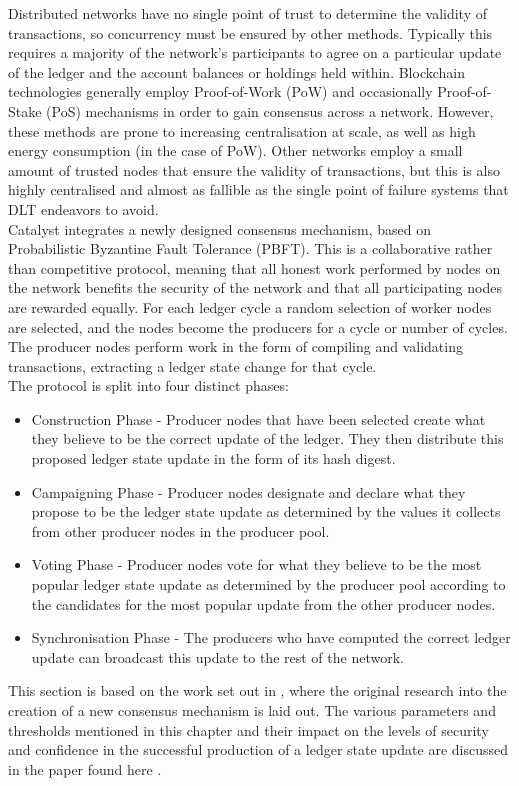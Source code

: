 Distributed networks have no single point of trust to determine the validity of transactions, so concurrency must be ensured by other methods. Typically this requires a majority of the network's participants to agree on a particular update of the ledger and the account balances or holdings held within. Blockchain technologies generally employ Proof-of-Work (PoW) and occasionally Proof-of-Stake (PoS) mechanisms in order to gain consensus across a network. However, these methods are prone to increasing centralisation at scale, as well as high energy consumption (in the case of PoW). Other networks employ a small amount of trusted nodes that ensure the validity of transactions, but this is also highly centralised and almost as fallible as the single point of failure systems that DLT endeavors to avoid. \\

Catalyst integrates a newly designed consensus mechanism, based on Probabilistic Byzantine Fault Tolerance (PBFT).  This is a collaborative rather than competitive protocol, meaning that all honest work performed by nodes on the network benefits the security of the network and that all participating nodes are rewarded equally. For each ledger cycle a random selection of worker nodes are selected, and the nodes become the producers for a cycle or number of cycles. The producer nodes perform work in the form of compiling and validating transactions, extracting a ledger state change for that cycle. \\

The protocol is split into four distinct phases:

\begin{itemize}

\item Construction Phase - Producer nodes that have been selected create what they believe to be the correct update of the ledger. They then distribute this proposed ledger state update in the form of its hash digest.
\item Campaigning Phase - Producer nodes designate and declare what they propose to be the ledger state update as determined by the values it collects from other producer nodes in the producer pool.
\item Voting Phase - Producer nodes vote for what they believe to be the most popular ledger state update as determined by the producer pool according to the candidates for the most popular update from the other producer nodes.
\item Synchronisation Phase - The producers who have computed the correct ledger update can broadcast this update to the rest of the network.

\end{itemize}

This section is based on the work set out in \cite{catalystresearch}, where the original research into the creation of a new consensus mechanism is laid out. The various parameters and thresholds mentioned in this chapter and their impact on the levels of security and confidence in the successful production of a ledger state update are discussed in the paper found here \cite{catalystresearch2}.